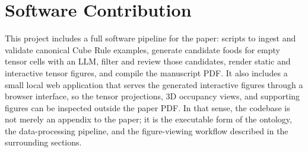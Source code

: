 \section{Software Contribution}

This project includes a full software pipeline for the paper: scripts to ingest and validate canonical Cube Rule examples, generate candidate foods for empty tensor cells with an LLM, filter and review those candidates, render static and interactive tensor figures, and compile the manuscript PDF.
It also includes a small local web application that serves the generated interactive figures through a browser interface, so the tensor projections, 3D occupancy views, and supporting figures can be inspected outside the paper PDF.
In that sense, the codebase is not merely an appendix to the paper; it is the executable form of the ontology, the data-processing pipeline, and the figure-viewing workflow described in the surrounding sections.
